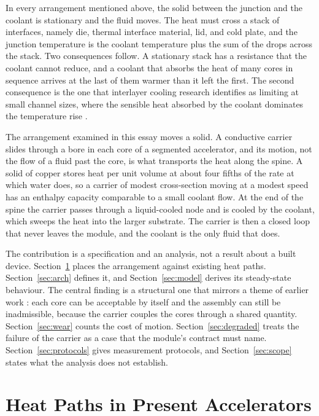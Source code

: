 \documentclass[11pt]{article}
\theoremstyle{definition}
\theoremstyle{plain}
\theoremstyle{remark}
\begin{document}
In every arrangement mentioned above, the solid between the junction and the coolant is stationary and the fluid moves. The heat must cross a stack of interfaces, namely die, thermal interface material, lid, and cold plate, and the junction temperature is the coolant temperature plus the sum of the drops across the stack. Two consequences follow. A stationary stack has a resistance that the coolant cannot reduce, and a coolant that absorbs the heat of many cores in sequence arrives at the last of them warmer than it left the first. The second consequence is the one that interlayer cooling research identifies as limiting at small channel sizes, where the sensible heat absorbed by the coolant dominates the temperature rise \cite{brunschwiler}.

The arrangement examined in this essay moves a solid. A conductive carrier slides through a bore in each core of a segmented accelerator, and its motion, not the flow of a fluid past the core, is what transports the heat along the spine. A solid of copper stores heat per unit volume at about four fifths of the rate at which water does, so a carrier of modest cross-section moving at a modest speed has an enthalpy capacity comparable to a small coolant flow. At the end of the spine the carrier passes through a liquid-cooled node and is cooled by the coolant, which sweeps the heat into the larger substrate. The carrier is then a closed loop that never leaves the module, and the coolant is the only fluid that does.

The contribution is a specification and an analysis, not a result about a built device. Section~\ref{sec:paths} places the arrangement against existing heat paths. Section~\ref{sec:arch} defines it, and Section~\ref{sec:model} derives its steady-state behaviour. The central finding is a structural one that mirrors a theme of earlier work \cite{flyxion-local}: each core can be acceptable by itself and the assembly can still be inadmissible, because the carrier couples the cores through a shared quantity. Section~\ref{sec:wear} counts the cost of motion. Section~\ref{sec:degraded} treats the failure of the carrier as a case that the module's contract must name. Section~\ref{sec:protocols} gives measurement protocols, and Section~\ref{sec:scope} states what the analysis does not establish.

\section{Heat Paths in Present Accelerators}
\label{sec:paths}
\end{document}

